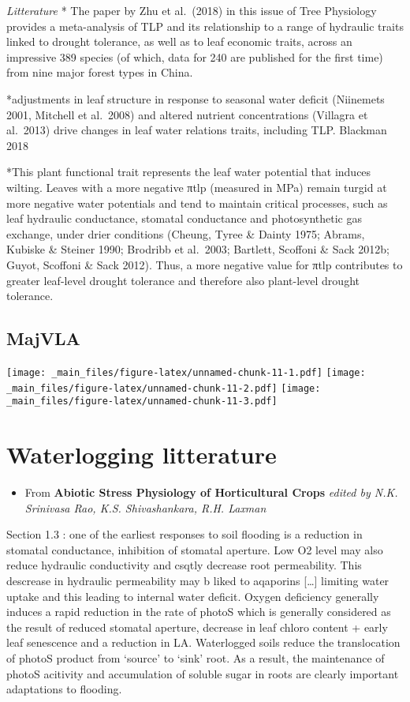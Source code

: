 \documentclass[
]{book}
\providecommand{\tightlist}{%
  \setlength{\itemsep}{0pt}\setlength{\parskip}{0pt}}
\begin{document}
\emph{Litterature}
* The paper by Zhu et al.~(2018) in this issue of Tree Physiology provides a meta-analysis of TLP and its relationship to a range of hydraulic traits linked to drought tolerance, as well as to leaf economic traits, across an impressive 389 species (of which, data for 240 are published for the first time) from nine major forest types in China.

*adjustments in leaf structure in response to seasonal water deficit (Niinemets 2001, Mitchell et al.~2008) and altered nutrient concentrations (Villagra et al.~2013) drive changes in leaf water relations traits, including TLP. Blackman 2018

*This plant functional trait represents the leaf water potential that induces wilting. Leaves with a more negative πtlp (measured in MPa) remain turgid at more negative water potentials and tend to maintain critical processes, such as leaf hydraulic conductance, stomatal conductance and photosynthetic gas exchange, under drier conditions (Cheung, Tyree \& Dainty 1975; Abrams, Kubiske \& Steiner 1990; Brodribb et al.~2003; Bartlett, Scoffoni \& Sack 2012b; Guyot, Scoffoni \& Sack 2012). Thus, a more negative value for πtlp contributes to greater leaf-level drought tolerance and therefore also plant-level drought tolerance.

\hypertarget{majvla}{%
\section{MajVLA}\label{majvla}}

\texttt{[image: \_main\_files/figure-latex/unnamed-chunk-11-1.pdf]} \texttt{[image: \_main\_files/figure-latex/unnamed-chunk-11-2.pdf]} \texttt{[image: \_main\_files/figure-latex/unnamed-chunk-11-3.pdf]}

\hypertarget{waterlogging-litterature}{%
\chapter{Waterlogging litterature}\label{waterlogging-litterature}}

\begin{itemize}
\tightlist
\item
  From \textbf{Abiotic Stress Physiology of Horticultural Crops} \emph{edited by N.K. Srinivasa Rao, K.S. Shivashankara, R.H. Laxman}
\end{itemize}

Section 1.3 : one of the earliest responses to soil flooding is a reduction in stomatal conductance, inhibition of stomatal aperture. Low O2 level may also reduce hydraulic conductivity and csqtly decrease root permeability. This descrease in hydraulic permeability may b liked to aqaporins {[}\ldots{]} limiting water uptake and this leading to internal water deficit. Oxygen deficiency generally induces a rapid reduction in the rate of photoS which is generally considered as the result of reduced stomatal aperture, decrease in leaf chloro content + early leaf senescence and a reduction in LA. Waterlogged soils reduce the translocation of photoS product from `source' to `sink' root. As a result, the maintenance of photoS acitivity and accumulation of soluble sugar in roots are clearly important adaptations to flooding.
\end{document}

